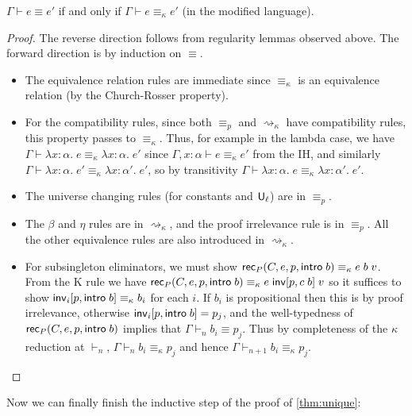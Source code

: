 \begin{theorem}\label{thm:ckappa}
$\Gamma\vdash e\equiv e'$ if and only if $\Gamma\vdash e\equiv_\kappa e'$ (in the modified language).
\end{theorem}
\begin{proof}
The reverse direction follows from regularity lemmas observed above. The forward direction is by induction on $\equiv$.
\begin{itemize}
\item The equivalence relation rules are immediate since $\equiv_\kappa$ is an equivalence relation (by the Church-Rosser property).
\item For the compatibility rules, since both $\equiv_p$ and $\rightsquigarrow_\kappa$ have compatibility rules, this property passes to $\equiv_\kappa$. Thus, for example in the lambda case, we have $\Gamma\vdash\lambda x:\alpha.\;e\equiv_\kappa\lambda x:\alpha.\;e'$ since $\Gamma,x:\alpha\vdash e\equiv_\kappa e'$ from the IH, and similarly $\Gamma\vdash\lambda x:\alpha.\;e'\equiv_\kappa\lambda x:\alpha'.\;e'$, so by transitivity $\Gamma\vdash\lambda x:\alpha.\;e\equiv_\kappa\lambda x:\alpha'.\;e'$.
\item The universe changing rules (for constants and $\mathsf{U}_\ell$) are in $\equiv_p$.
\item The $\beta$ and $\eta$ rules are in $\rightsquigarrow_\kappa$, and the proof irrelevance rule is in $\equiv_p$. All the other equivalence rules are also introduced in $\rightsquigarrow_\kappa$.
\item For subsingleton eliminators, we must show $\mathsf{rec}_P(C,e,p,\mathsf{intro}\;b)\equiv_\kappa e\;b\;v$. From the K rule we have $\mathsf{rec}_P(C,e,p,\mathsf{intro}\;b)\equiv_\kappa e\;\mathsf{inv}[p,c\;b]\;v$ so it suffices to show $\mathsf{inv}_i[p,\mathsf{intro}\;b]\equiv_\kappa b_i$ for each $i$. If $b_i$ is propositional then this is by proof irrelevance, otherwise $\mathsf{inv}_i[p,\mathsf{intro}\;b]=p_j$, and the well-typedness of $\mathsf{rec}_P(C,e,p,\mathsf{intro}\;b)$ implies that $\Gamma\vdash_n b_i\equiv p_j$. Thus by completeness of the $\kappa$ reduction at $\vdash_n$, $\Gamma\vdash_n b_i\equiv_\kappa p_j$ and hence $\Gamma\vdash_{n+1} b_i\equiv_\kappa p_j$.
\end{itemize}
\end{proof}

Now we can finally finish the inductive step of the proof of \autoref{thm:unique}:

